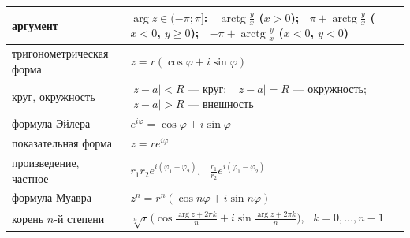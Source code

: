 \documentclass[a4paper,11pt]{article}
\begin{document}
\begin{longtable}{|>{\raggedright\arraybackslash}p{4.4cm}|>{\raggedright\arraybackslash}p{11.7cm}|}
аргумент & $\arg z \in (-\pi; \pi]$: \ $\operatorname{arctg}\frac yx$ ($x > 0$); \ $\pi + \operatorname{arctg}\frac yx$ ($x < 0$, $y \ge 0$); \ $-\pi + \operatorname{arctg}\frac yx$ ($x < 0$, $y < 0$) \\ \hline
тригонометрическая форма & $z = r(\cos\varphi + i\sin\varphi)$ \\ \hline
круг, окружность & $|z - a| < R$ --- круг; \ $|z - a| = R$ --- окружность; \ $|z - a| > R$ --- внешность \\ \hline
формула Эйлера & $e^{i\varphi} = \cos\varphi + i\sin\varphi$ \\ \hline
показательная форма & $z = r e^{i\varphi}$ \\ \hline
произведение, частное & $r_1 r_2 e^{i(\varphi_1 + \varphi_2)}$, \ $\frac{r_1}{r_2} e^{i(\varphi_1 - \varphi_2)}$ \\ \hline
формула Муавра & $z^n = r^n(\cos n\varphi + i\sin n\varphi)$ \\ \hline
корень $n$-й степени & $\sqrt[n]{r}\bigl(\cos\frac{\arg z + 2\pi k}{n} + i\sin\frac{\arg z + 2\pi k}{n}\bigr)$, \ $k = 0, \dots, n - 1$ \\ \hline
\end{longtable}
\normalsize
\end{document}
